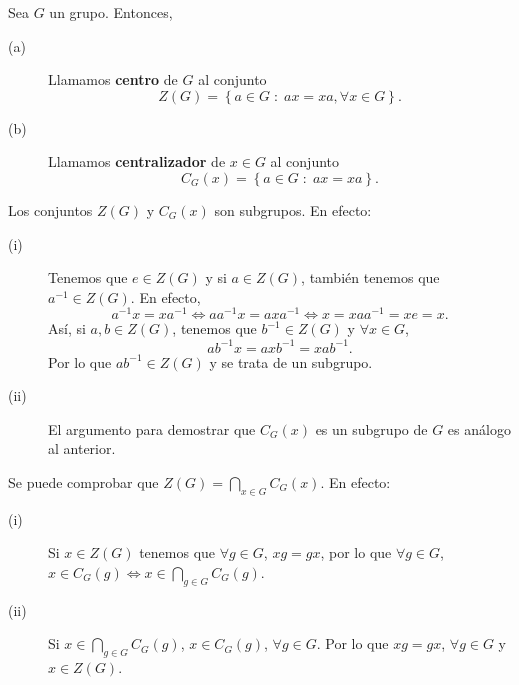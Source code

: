 \begin{definition}
Sea $\displaystyle G $ un grupo. Entonces, 
\begin{description}
\item[(a)] Llamamos \textbf{centro} de $\displaystyle G $ al conjunto 
	\[Z\left(G\right) = \left\{ a \in G \; : \; ax = xa, \forall x \in G\right\}  .\]
\item[(b)] Llamamos \textbf{centralizador} de $\displaystyle x \in G $ al conjunto 
	\[C_{G}\left(x\right) = \left\{ a \in G \; : \; ax = xa\right\}  .\]
\end{description}
\end{definition}
\begin{observation}
Los conjuntos $\displaystyle Z\left(G\right) $ y $\displaystyle C_{G}\left(x\right) $ son subgrupos. En efecto:
\begin{description}
\item[(i)] Tenemos que $\displaystyle e \in Z\left(G\right) $ y si $\displaystyle a \in Z\left(G\right) $, también tenemos que $\displaystyle a^{-1} \in Z\left(G\right) $. En efecto, 
	\[a^{-1}x = xa^{-1} \iff a a^{-1}x = a x a^{-1} \iff x = x a a^{-1} = x e = x .\]
	Así, si $\displaystyle a,b \in Z\left(G\right) $, tenemos que $\displaystyle b^{-1} \in Z\left(G\right) $ y $\displaystyle \forall x \in G $,
	\[ab^{-1}x = axb^{-1} = xab^{-1} .\]
	Por lo que $\displaystyle ab^{-1} \in Z\left(G\right) $ y se trata de un subgrupo.
\item[(ii)] El argumento para demostrar que $\displaystyle C_{G}\left(x\right) $ es un subgrupo de $\displaystyle G $ es análogo al anterior.
\end{description}
\end{observation}

\begin{observation}
Se puede comprobar que $\displaystyle Z\left(G\right) = \bigcap_{x \in G}C_{G}\left(x\right) $. En efecto:
\begin{description}
\item[(i)] Si $\displaystyle x \in Z\left(G\right) $ tenemos que $\displaystyle \forall g \in G $, $\displaystyle x g = g x $, por lo que $\displaystyle \forall g \in G $, $\displaystyle x \in C_{G}\left(g\right) \iff x \in \bigcap_{g \in G}C_{G}\left(g\right) $.
\item[(ii)] Si $\displaystyle x \in \bigcap_{g \in G}C_{G}\left(g\right) $, $\displaystyle x \in C_{G}\left(g\right) $, $\displaystyle \forall g \in G $. Por lo que $\displaystyle xg = gx $, $\displaystyle \forall g \in G $ y $\displaystyle x \in Z\left(G\right) $.
\end{description}
\end{observation}
